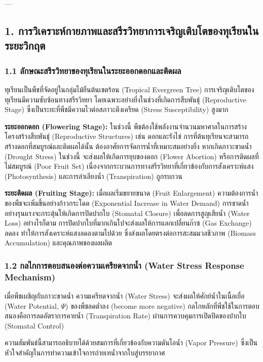 \documentclass[11pt,a4paper,openany]{report}
\begin{document}
---

\subsection{1. การวิเคราะห์กายภาพและสรีรวิทยาการเจริญเติบโตของทุเรียนในระยะวิกฤต}


\subsubsection{1.1 ลักษณะสรีรวิทยาของทุเรียนในระยะออกดอกและติดผล}


ทุเรียนเป็นพืชที่จัดอยู่ในกลุ่มไม้ยืนต้นเขตร้อน (Tropical Evergreen Tree) การเจริญเติบโตของทุเรียนมีความซับซ้อนทางสรีรวิทยา โดยเฉพาะอย่างยิ่งในช่วงที่เกิดการสืบพันธุ์ (Reproductive Stage) ซึ่งเป็นระยะที่พืชมีความไวต่อสภาวะตึงเครียด (Stress Susceptibility) สูงมาก

\textbf{ระยะออกดอก (Flowering Stage):}
ในช่วงนี้ พืชต้องใช้พลังงานจำนวนมหาศาลในการสร้างโครงสร้างสืบพันธุ์ (Reproductive Structures) เช่น ดอกและรังไข่ การที่ต้นทุเรียนจะสามารถสร้างดอกที่สมบูรณ์และติดผลได้นั้น ต้องอาศัยการจัดการน้ำที่เหมาะสมอย่างยิ่ง หากเกิดภาวะขาดน้ำ (Drought Stress) ในช่วงนี้ จะส่งผลให้เกิดการยุบของดอก (Flower Abortion) หรือการติดผลที่ไม่สมบูรณ์ (Poor Fruit Set) เนื่องจากกระบวนการทางสรีรวิทยาที่เกี่ยวข้องกับการสังเคราะห์แสง (Photosynthesis) และการลำเลียงน้ำ (Transpiration) ถูกรบกวน

\textbf{ระยะติดผล (Fruiting Stage):}
เมื่อผลเริ่มขยายขนาด (Fruit Enlargement) ความต้องการน้ำของพืชจะเพิ่มขึ้นอย่างก้าวกระโดด (Exponential Increase in Water Demand) การขาดน้ำอย่างรุนแรงจะกระตุ้นให้เกิดการปิดปากใบ (Stomatal Closure) เพื่อลดการสูญเสียน้ำ (Water Loss) อย่างไรก็ตาม การปิดปากใบที่มากเกินไปจะส่งผลให้การแลกเปลี่ยนก๊าซ (Gas Exchange) ลดลง ทำให้การสังเคราะห์แสงลดลงตามไปด้วย ซึ่งส่งผลโดยตรงต่อการสะสมมวลชีวภาพ (Biomass Accumulation) และคุณภาพของผลผลิต

\subsubsection{1.2 กลไกการตอบสนองต่อความเครียดจากน้ำ (Water Stress Response Mechanism)}


เมื่อพืชเผชิญกับภาวะขาดน้ำ ความเครียดจากน้ำ (Water Stress) จะส่งผลให้ศักย์น้ำในเนื้อเยื่อ (Water Potential, $\Psi$) ของพืชลดต่ำลง (become more negative) กลไกหลักที่พืชใช้ในการตอบสนองคือการลดอัตราการคายน้ำ (Transpiration Rate) ผ่านการควบคุมการเปิดปิดของปากใบ (Stomatal Control)

ความสัมพันธ์นี้สามารถอธิบายได้ด้วยสมการที่เกี่ยวข้องกับความดันไอน้ำ (Vapor Pressure) ซึ่งเป็นหัวใจสำคัญในการทำความเข้าใจการถ่ายเทน้ำจากใบสู่บรรยากาศ
\end{document}
